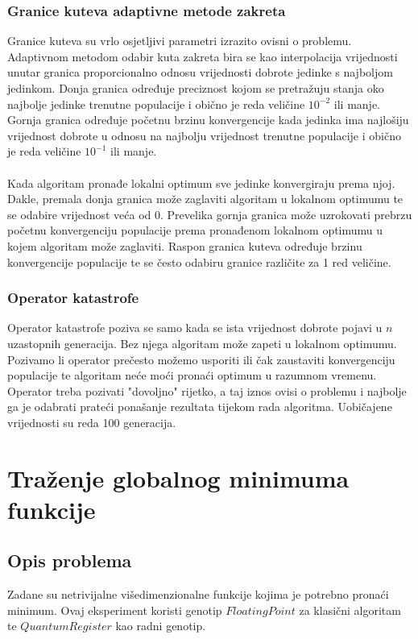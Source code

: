 \documentclass[times, utf8, zavrsni, numeric]{fer}
\begin{document}
\subsubsection{Granice kuteva adaptivne metode zakreta}
Granice kuteva su vrlo osjetljivi parametri izrazito ovisni o problemu. Adaptivnom metodom odabir kuta zakreta bira se kao interpolacija vrijednosti unutar granica proporcionalno odnosu vrijednosti dobrote jedinke s najboljom jedinkom. Donja granica određuje preciznost kojom se pretražuju stanja oko najbolje jedinke trenutne populacije i obično je reda veličine $10^{-2}$ ili manje.  Gornja granica određuje početnu brzinu konvergencije kada jedinka ima najlošiju vrijednost dobrote u odnosu na najbolju vrijednost trenutne populacije i obično je reda veličine $10^{-1}$ ili manje. 

\paragraph{}
Kada algoritam pronađe lokalni optimum sve jedinke konvergiraju prema njoj. Dakle, premala donja granica može zaglaviti algoritam u lokalnom optimumu te se odabire vrijednost veća od 0. Prevelika gornja granica može uzrokovati prebrzu početnu konvergenciju populacije prema pronađenom lokalnom optimumu u kojem algoritam može zaglaviti. Raspon granica kuteva određuje brzinu konvergencije populacije te se često odabiru granice različite za 1 red veličine.

\subsubsection{Operator katastrofe}
Operator katastrofe poziva se samo kada se ista vrijednost dobrote pojavi u $n$ uzastopnih generacija. Bez njega algoritam može zapeti u lokalnom optimumu. Pozivamo li operator prečesto možemo usporiti ili čak zaustaviti konvergenciju populacije te algoritam neće moći pronaći optimum u razumnom vremenu. Operator treba pozivati "dovoljno" rijetko, a taj iznos ovisi o problemu i najbolje ga je odabrati prateći ponašanje rezultata tijekom rada algoritma. Uobičajene vrijednosti su reda 100 generacija.

\clearpage

\section{Traženje globalnog minimuma funkcije}
\subsection{Opis problema}
Zadane su netrivijalne višedimenzionalne funkcije kojima je potrebno pronaći minimum.
Ovaj eksperiment koristi genotip $FloatingPoint$ za klasični algoritam te $QuantumRegister$ kao radni genotip.
\end{document}
